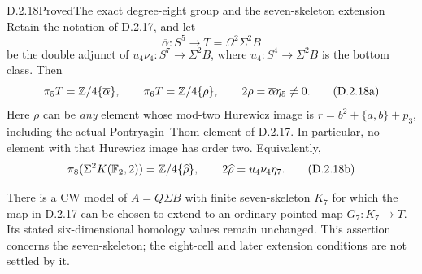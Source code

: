 \begin{claim}{D.2.18}{Proved}{The exact degree-eight group and the seven-skeleton extension}
Retain the notation of D.2.17, and let
\[
 \overline\alpha:S^5\longrightarrow T=\Omega^2\Sigma^2B
\]
be the double adjunct of $u_4\nu_4:S^7\to\Sigma^2B$, where
$u_4:S^4\to\Sigma^2B$ is the bottom class. Then
\[
 \pi_5T=\mathbb Z/4\{\overline\alpha\},\qquad
 \pi_6T=\mathbb Z/4\{\rho\},\qquad
 2\rho=\overline\alpha\eta_5\ne0.
 \tag{D.2.18a}
\]
Here $\rho$ can be \emph{any} element whose mod-two Hurewicz image is
$r=b^2+\{a,b\}+p_3$, including the actual Pontryagin--Thom element
of D.2.17. In particular, no element with that Hurewicz image has
order two. Equivalently,
\[
 \pi_8(\Sigma^2K(\mathbb F_2,2))=\mathbb Z/4\{\widehat\rho\},\qquad
 2\widehat\rho=u_4\nu_4\eta_7.
 \tag{D.2.18b}
\]

There is a CW model of $A=Q\Sigma B$ with finite seven-skeleton
$K_7$ for which the map in D.2.17 can be chosen to extend to an
ordinary pointed map $G_7:K_7\to T$. Its stated six-dimensional
homology values remain unchanged. This assertion concerns the
seven-skeleton; the eight-cell and later extension conditions are
not settled by it.
\end{claim}

